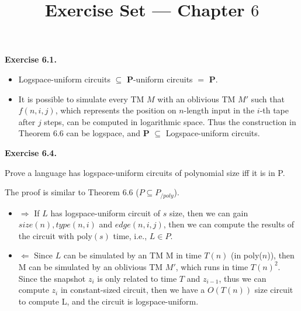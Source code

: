 \documentclass[a4paper]{article}
\title{Exercise Set --- Chapter $6$}
\date{}
\newenvironment{exercise}[1]{
	\par
	\noindent\textbf{Exercise #1.}\quad
}{
	\par
	\bigskip
}
\begin{document}
\maketitle

\begin{exercise}{6.1}
    \begin{itemize}
    \item Logspace-uniform circuits $\subseteq$ $\mathbf{P}$-uniform circuits $=$ $\mathbf{P}$.
    \item It is possible to simulate every TM $M$ with an oblivious TM $M'$ such that $f(n,i,j)$, which represents the position
        on $n$-length input in the $i$-th tape after $j$ steps, can be computed in logarithmic space.
            Thus the construction in Theorem 6.6 can be logspace, and $\mathbf{P}$ $\subseteq$ Logspace-uniform circuits.
    \end{itemize}
\end{exercise}

\begin{exercise}{6.4}
Prove a language has logspace-uniform circuits of polynomial size iff it is in P.

    The proof is similar to Theorem 6.6 ($P \subseteq P_{/poly}$).

\begin{itemize}
\item $\Rightarrow$  If $L$ has logspace-uniform circuit of $s$ size, then we can gain $size(n), type(n,i)$ and $edge(n,i,j)$, then we can compute the results of the circuit with poly$(s)$ time, i.e., $L \in P$.

\item $\Leftarrow$ Since $L$ can be simulated by an TM M in time $T(n)$ (in poly($n$)), then M can be simulated by an oblivious TM $M'$, which runs in time $T(n)^{2}$. Since  the snapshot $z_{i}$ is only related to time $T$ and $z_{i-1}$, thus we can compute $z_{i}$ in constant-sized circuit, then we have a $O(T(n))$ size circuit to compute L, and the circuit is logspace-uniform.
\end{itemize}
\end{exercise}
\end{document}
